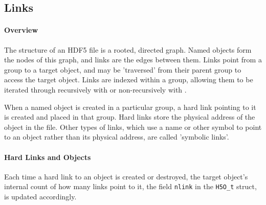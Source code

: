 \subsection{Links}

\paragraph{Overview} The structure of an HDF5 file is a rooted, directed graph. Named objects form the nodes of this graph, and links are the edges between them. Links point from a group to a target object, and may be 'traversed' from their parent group to access the target object. Links are indexed within a group, allowing them to be iterated through recursively with  or non-recursively with .

When a named object is created in a particular group, a hard link pointing to it is created and placed in that group. Hard links store the physical address of the object in the file. Other types of links, which use a name or other symbol to point to an object rather than its physical address, are called 'symbolic links'.

\paragraph{Hard Links and Objects} Each time a hard link to an object is created or destroyed, the target object's internal count of how many links point to it, the field \texttt{nlink} in the \texttt{H5O\_t} struct, is updated accordingly.

